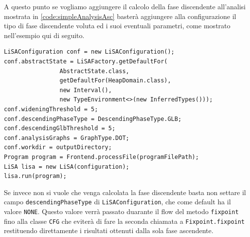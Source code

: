 A questo punto se vogliamo aggiungere il calcolo della fase discendente all'analisi mostrata in \ref{code:simpleAnalysisAsc} basterà aggiungere alla configurazione il tipo di fase discendente voluta ed i suoi eventuali parametri, come mostrato nell'esempio qui di seguito. 
\begin{lstlisting}[belowskip=-1.1 \baselineskip]
LiSAConfiguration conf = new LiSAConfiguration();
conf.abstractState = LiSAFactory.getDefaultFor(
				AbstractState.class, 
				getDefaultFor(HeapDomain.class), 
				new Interval(),
				new TypeEnvironment<>(new InferredTypes()));
conf.wideningThreshold = 5;
conf.descendingPhaseType = DescendingPhaseType.GLB;
conf.descendingGlbThreshold = 5;
conf.analysisGraphs = GraphType.DOT;
conf.workdir = outputDirectory;
Program program = Frontend.processFile(programFilePath);
LiSA lisa = new LiSA(configuration);
lisa.run(program);
\end{lstlisting}
Se invece non si vuole che venga calcolata la fase discendente basta non settare il campo \texttt{descendingPhaseType} di \texttt{LiSAConfiguration}, che come default ha il valore \texttt{NONE}. Questo valore verrà passato duarante il flow del metodo \texttt{fixpoint} fino alla classe \texttt{CFG} che eviterà di fare la seconda chiamata a \texttt{Fixpoint.fixpoint} restituendo direttamente i risultati ottenuti dalla sola fase ascendente.